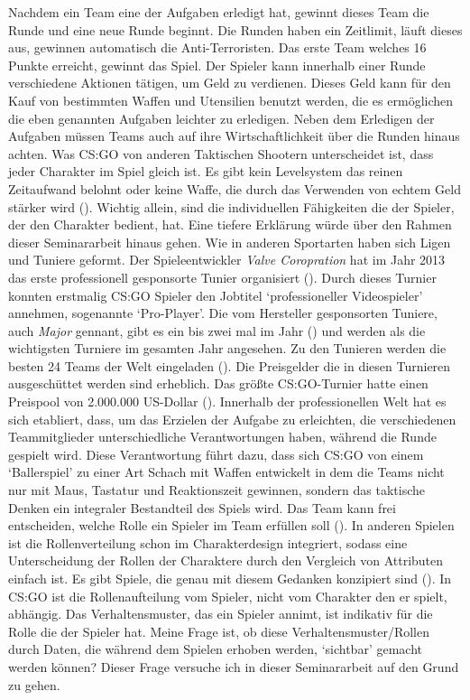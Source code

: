 \documentclass[envcountsame, envcountchap, deutsch]{i-studis}
\begin{document}
Nachdem ein Team eine der Aufgaben erledigt hat, gewinnt dieses Team die Runde und eine neue Runde beginnt. Die Runden haben ein Zeitlimit, läuft dieses aus, gewinnen automatisch die Anti-Terroristen. 
Das erste Team welches 16 Punkte erreicht, gewinnt das Spiel.
Der Spieler kann innerhalb einer Runde verschiedene Aktionen tätigen, um Geld zu verdienen. 
Dieses Geld kann für den Kauf von bestimmten Waffen und Utensilien benutzt werden, die es ermöglichen die eben genannten Aufgaben leichter zu erledigen. 
Neben dem Erledigen der Aufgaben müssen Teams auch auf ihre Wirtschaftlichkeit über die Runden hinaus achten.
Was CS:GO von anderen Taktischen Shootern unterscheidet ist, dass jeder Charakter im Spiel gleich ist.
Es gibt kein Levelsystem das reinen Zeitaufwand belohnt oder keine Waffe, die durch das Verwenden von echtem Geld stärker wird (\cite{TheWarOwl_2012}).
Wichtig allein, sind die individuellen Fähigkeiten die der Spieler, der den Charakter bedient, hat.
Eine tiefere Erklärung würde über den Rahmen dieser Seminararbeit hinaus gehen. Wie in anderen Sportarten haben sich
Ligen und Tuniere geformt. Der Spieleentwickler \textit{Valve Coropration}
hat im Jahr 2013 das erste professionell gesponsorte Tunier organisiert (\cite{Corporation_2013}).
Durch dieses Turnier konnten erstmalig CS:GO Spieler den Jobtitel `professioneller Videospieler' annehmen, sogenannte `Pro-Player'. 
Die vom Hersteller gesponsorten Tuniere, auch \textit{Major} gennant, gibt es ein bis zwei mal im Jahr (\cite{Mclaughlin_2023}) und werden als die wichtigsten
Turniere im gesamten Jahr angesehen. Zu den Tunieren werden die besten 24 Teams der Welt eingeladen (\cite{Magal_2023}).
Die Preisgelder die in diesen Turnieren ausgeschüttet werden sind erheblich. Das größte CS:GO-Turnier hatte einen Preispool von 2.000.000 US-Dollar (\cite{Strike_2021}).
Innerhalb der professionellen Welt hat es sich etabliert, dass, um das Erzielen der Aufgabe zu erleichten, die verschiedenen Teammitglieder
unterschiedliche Verantwortungen haben, während die Runde gespielt wird. Diese Verantwortung führt dazu, 
dass sich CS:GO von einem `Ballerspiel' zu einer Art Schach mit Waffen entwickelt in dem die Teams nicht nur mit Maus, Tastatur und Reaktionszeit 
gewinnen, sondern das taktische Denken ein integraler Bestandteil des Spiels wird. 
Das Team kann frei entscheiden, welche Rolle ein Spieler im Team erfüllen soll (\cite{TV_2023}).
In anderen Spielen ist die Rollenverteilung schon im Charakterdesign integriert, sodass eine Unterscheidung der Rollen der
Charaktere durch den Vergleich von Attributen einfach ist. Es gibt Spiele, die genau mit diesem Gedanken konzipiert sind (\cite{Entertainment_2019}). 
In CS:GO ist die Rollenaufteilung vom Spieler, nicht vom Charakter den er spielt, abhängig. Das Verhaltensmuster, das ein Spieler annimt, ist 
indikativ für die Rolle die der Spieler hat. Meine Frage ist, ob diese Verhaltensmuster/Rollen durch Daten, die während dem Spielen erhoben werden,
`sichtbar' gemacht werden können? Dieser Frage versuche ich in dieser Seminararbeit auf den Grund zu gehen.
\end{document}
